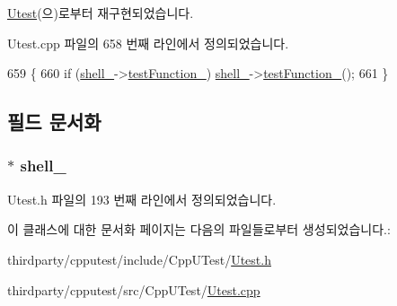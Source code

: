 \hyperlink{class_utest_ae62cdb23024dce723301fba2479b52a4}{Utest}(으)로부터 재구현되었습니다.



Utest.\+cpp 파일의 658 번째 라인에서 정의되었습니다.


\begin{DoxyCode}
659 \{
660     \textcolor{keywordflow}{if} (\hyperlink{class_exec_function_test_afdceb680dc32abae41e3755374a67cea}{shell\_}->\hyperlink{class_exec_function_test_shell_a8bd9b345a776ac6a0095aff4f4e31d03}{testFunction\_}) \hyperlink{class_exec_function_test_afdceb680dc32abae41e3755374a67cea}{shell\_}->\hyperlink{class_exec_function_test_shell_a8bd9b345a776ac6a0095aff4f4e31d03}{testFunction\_}();
661 \}
\end{DoxyCode}


\subsection{필드 문서화}
\subsubsection[{\texorpdfstring{shell\+\_\+}{shell_}}]{$\ast$ shell\+\_\+\hspace{0.3cm}{\ttfamily [private]}}\hypertarget{class_exec_function_test_afdceb680dc32abae41e3755374a67cea}{}\label{class_exec_function_test_afdceb680dc32abae41e3755374a67cea}


Utest.\+h 파일의 193 번째 라인에서 정의되었습니다.



이 클래스에 대한 문서화 페이지는 다음의 파일들로부터 생성되었습니다.\+:\begin{DoxyCompactItemize}
\item 
thirdparty/cpputest/include/\+Cpp\+U\+Test/\hyperlink{_utest_8h}{Utest.\+h}\item 
thirdparty/cpputest/src/\+Cpp\+U\+Test/\hyperlink{_utest_8cpp}{Utest.\+cpp}\end{DoxyCompactItemize}
